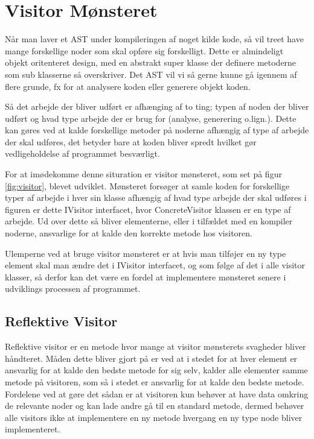 \section{Visitor Mønsteret}\label{sec:visitor}


Når man laver et AST under kompileringen af noget kilde kode, så vil treet have mange forskellige noder som skal opføre sig forskelligt. Dette er almindeligt objekt oritenteret design, med en abstrakt super klasse der definere metoderne som sub klasserne så overskriver. Det AST vil vi så gerne kunne gå igennem af flere grunde, fx for at analysere koden eller generere objekt koden. 

Så det arbejde der bliver udført er afhænging af to ting; typen af noden der bliver udført og hvad type arbejde der er brug for (analyse, generering o.lign.). Dette kan gøres ved at kalde forskellige metoder på noderne afhængig af type af arbejde der skal udføres, det betyder bare at koden bliver spredt hvilket gør vedligeholdelse af programmet besværligt.


For at imødekomme denne situration er visitor mønsteret, som set på figur \ref{fig:visitor}, blevet udviklet. Mønsteret forsøger at samle koden for forskellige typer af arbejde i hver sin klasse afhængig af hvad type arbejde der skal udføres i figuren er dette IVisitor interfacet, hvor ConcreteVisitor klassen er en type af arbejde. Ud over dette så bliver elementerne, eller i tilfældet med en kompiler noderne, ansvarlige for at kalde den korrekte metode hos visitoren.

Ulemperne ved at bruge visitor mønsteret er at hvis man tilføjer en ny type element skal man ændre det i IVisitor interfacet, og som følge af det i alle visitor klasser, så derfor kan det være en fordel at implementere mønsteret senere i udviklings processen af programmet.

\subsection{Reflektive Visitor}\label{ssec:refvisitor}

Reflektive visitor er en metode hvor mange at visitor mønsterets svagheder bliver håndteret. Måden dette bliver gjort på er ved at i stedet for at hver element er ansvarlig for at kalde den bedste metode for sig selv, kalder alle elementer samme metode på visitoren, som så i stedet er ansvarlig for at kalde den bedste metode. Fordelene ved at gøre det sådan er at visitoren kun behøver at have data omkring de relevante noder og kan lade andre gå til en standard metode, dermed behøver alle visitors ikke at implementere en ny metode hvergang en ny type node bliver implementeret.